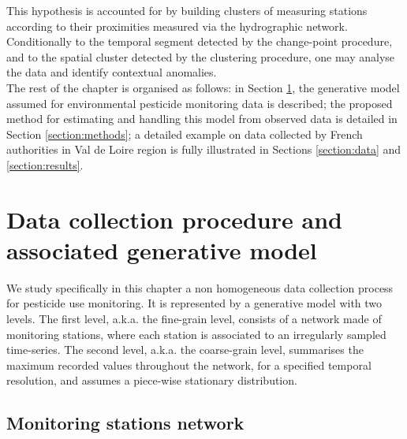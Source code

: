This hypothesis is accounted for by building clusters of measuring stations according to their proximities measured via the hydrographic network. \\
Conditionally to the temporal segment detected by the change-point procedure, and to the spatial cluster detected by the clustering procedure, one may analyse the data and identify contextual anomalies. \\
The rest of the chapter is organised as follows: in Section \ref{section:data:model}, the generative model assumed for environmental pesticide monitoring data is described; the proposed method for estimating and handling this model from observed data is detailed in Section \ref{section:methods}; a detailed example on data collected by French authorities in Val de Loire region is fully illustrated in Sections \ref{section:data} and \ref{section:results}. 





\section{Data collection procedure and associated generative model}\label{section:data:model}

We study specifically in this chapter a non homogeneous data collection process for pesticide use monitoring. It is represented by a generative model with two levels. The first level, a.k.a. the fine-grain level, consists of a network made of monitoring stations, where each station is associated to an irregularly sampled time-series. The second level, a.k.a. the coarse-grain level, summarises the maximum recorded values throughout the network, for a specified temporal resolution, and assumes a piece-wise stationary distribution. 

\subsection{Monitoring stations network}\label{subsection:graph}

